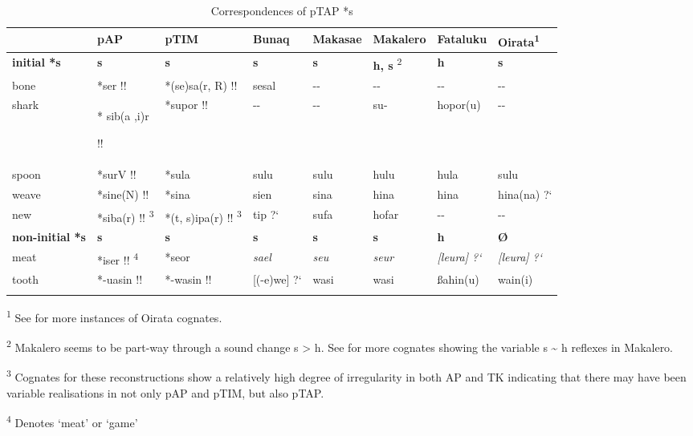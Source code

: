 \begin{table}
\caption{Correspondences of pTAP *s}
\label{tab:3:9}  
\begin{tabular}{llllllll}
\mytoprule
 & pAP & pTIM & Bunaq & Makasae & Makalero & Fataluku & Oirata\textsuperscript{1}\\
\midrule
{\bfseries initial *s} & {\bfseries *s} & {\bfseries *s} & {\bfseries s} & {\bfseries s} & \textbf{h, s} \textsuperscript{2} & {\bfseries h} & {\bfseries s} \\
bone & *ser !! & *(se)sa(r, R) !! & sesal & {}-{}- & {}-{}- & {}-{}- & {}-{}-\\
shark & * sib(a ,i)r

!! & *supor !! & {}-{}- & {}-{}- & su- & hopor(u) & {}-{}-\\
spoon & *surV !! & *sula & sulu & sulu & hulu & hula & sulu \\
weave & *sine(N) !! & *sina & sien & sina & hina & hina & hina(na) ?`\\
new & *siba(r) !! \textsuperscript{3} & *(t, s)ipa(r) !! \textsuperscript{3} & tip ?` & sufa & hofar & {}-{}- & {}-{}-\\
{\bfseries non-initial *s} & {\bfseries *s} & {\bfseries *s} & {\bfseries s} & {\bfseries s} & {\bfseries s} & {\bfseries h} & {\bfseries {\O}}\\
meat & *iser !! \textsuperscript{4} & *seor & {\itshape sael} & {\itshape seu} & {\itshape seur} & {\itshape [leura] ?`} & {\itshape [leura] ?`}\\
tooth & *-uasin !! & *-wasin !! & [(-e)we] ?` & wasi & wasi & {\ss}ahin(u) & wain(i)\\
\mybottomrule
\end{tabular} 
\textsuperscript{1} See \citet[209]{SchapperEtAl2012} for more instances of Oirata cognates.

\textsuperscript{2}\textbf{} Makalero seems to be part-way through a sound change s {\textgreater} h. See \citet[209-211]{SchapperEtAl2012} for more cognates showing the variable s \~{} h reflexes in Makalero. 

\textsuperscript{3} Cognates for these reconstructions show a relatively high degree of irregularity in both AP and TK indicating that there may have been variable realisations in not only pAP and pTIM, but also pTAP.

\textsuperscript{4} Denotes `meat' or `game'
\end{table}


